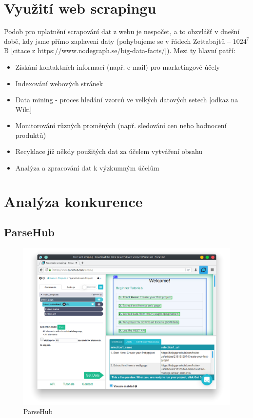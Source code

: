\documentclass[thesis=B,czech]{FITthesis}[2012/06/26]
\begin{document}
\section{Využití web scrapingu}
Podob pro uplatnění scrapování dat z webu je nespočet, a to obzvláš\v{t} v dnešní době, kdy jsme přímo zaplaveni daty (pohybujeme se v řádech Zettabajtů -- $1024^{7}$ B [citace z https://www.nodegraph.se/big-data-facts/]). Mezi ty hlavní patří:
\begin{itemize}
	\item Získání kontaktních informací (např. e-mail) pro marketingové účely
	\item Indexování webových stránek
	\item Data mining - proces hledání vzorců ve velkých datových setech [odkaz na Wiki]
	\item Monitorování různých proměných (např. sledování cen nebo hodnocení produktů)
	\item Recyklace již někdy použitých dat za účelem vytváření  obsahu
	\item Analýza a zpracování dat k výzkumným účelům
\end{itemize}


\newpage
\section{Analýza konkurence}


\subsection{ParseHub}
\begin{figure}[h]
	\includegraphics[width=\linewidth]{images/ParseHub.png}
	\caption{ParseHub}
	\label{fig:parseHub}
\end{figure}
\end{document}
